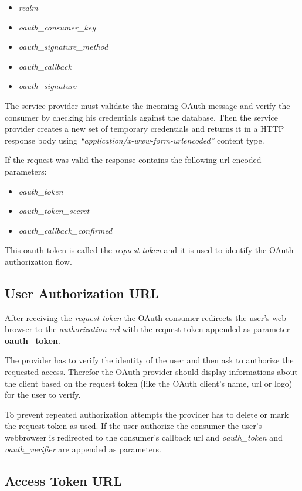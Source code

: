 \begin{itemize}
\item
  \emph{realm}
\item
  \emph{oauth\_consumer\_key}
\item
  \emph{oauth\_signature\_method}
\item
  \emph{oauth\_callback}
\item
  \emph{oauth\_signature}
\end{itemize}
The service provider must validate the incoming OAuth message and
verify the consumer by checking his credentials against the
database. Then the service provider creates a new set of temporary
credentials and returns it in a HTTP response body using
\emph{``application/x-www-form-urlencoded''} content type.

If the request was valid the response contains the following url
encoded parameters:

\begin{itemize}
\item
  \emph{oauth\_token}
\item
  \emph{oauth\_token\_secret}
\item
  \emph{oauth\_callback\_confirmed}
\end{itemize}
This oauth token is called the \emph{request token} and it is used
to identify the OAuth authorization flow.

\subsection{User Authorization URL}

After receiving the \emph{request token} the OAuth consumer
redirects the user's web browser to the \emph{authorization url}
with the request token appended as parameter
\textbf{oauth\_token}.

The provider has to verify the identity of the user and then ask to
authorize the requested access. Therefor the OAuth provider should
display informations about the client based on the request token
(like the OAuth client's name, url or logo) for the user to
verify.

To prevent repeated authorization attempts the provider has to
delete or mark the request token as used. If the user authorize the
consumer the user's webbrowser is redirected to the consumer's
callback url and \emph{oauth\_token} and \emph{oauth\_verifier} are
appended as parameters.

\subsection{Access Token URL}

